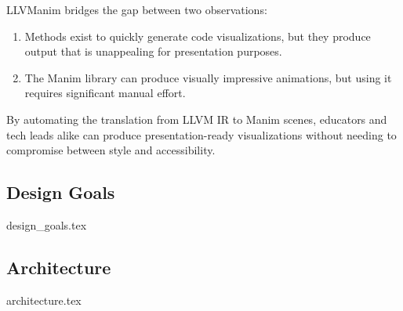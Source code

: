 LLVManim bridges the gap between two observations:
\begin{enumerate}
    \item Methods exist to quickly generate code visualizations, but they produce
    output that is unappealing for presentation purposes.
    \item The Manim library can produce visually impressive animations, but using
    it requires significant manual effort.
\end{enumerate}
By automating the translation from LLVM IR to Manim scenes, educators
and tech leads alike can produce presentation-ready visualizations
without needing to compromise between style and accessibility.


\subsection{Design Goals}
\label{sec:llvmanim:design_goals}
{design_goals.tex}

\subsection{Architecture}
\label{sec:llvmanim:architecture}
{architecture.tex}
